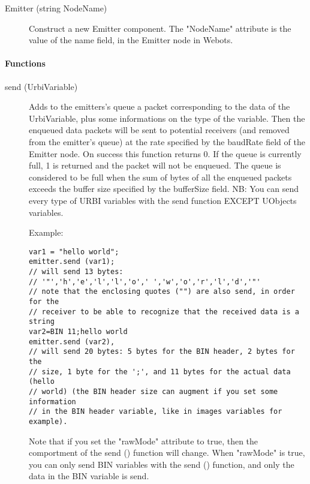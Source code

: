 \noindent
\begin{description}
\item[{Emitter (string NodeName)}] Construct a new Emitter component. The "NodeName" attribute is the value
          of the name field, in the Emitter node in Webots.

\end{description}

\paragraph{Functions}
\label{webots.uobjects.robotdevices.emitter.functions}%

\noindent
\begin{description}
\item[{send (UrbiVariable)}] Adds to the emitters's queue a packet
  corresponding to the data of the UrbiVariable, plus some
  informations on the type of the variable. Then the enqueued data
  packets will be sent to potential receivers (and removed from the
  emitter's queue) at the rate specified by the baudRate field of the
  Emitter node. On success this function returns 0. If the queue is
  currently full, 1 is returned and the packet will not be
  enqueued. The queue is considered to be full when the sum of bytes
  of all the enqueued packets exceeds the buffer size specified by the
  bufferSize field.  NB: You can send every type of URBI variables
  with the send function EXCEPT UObjects variables.


          Example:


\begin{lstlisting}
var1 = "hello world";
emitter.send (var1);
// will send 13 bytes:
// '"','h','e','l','l','o',' ','w','o','r','l','d','"'
// note that the enclosing quotes ("") are also send, in order for the
// receiver to be able to recognize that the received data is a string
var2=BIN 11;hello world
emitter.send (var2),
// will send 20 bytes: 5 bytes for the BIN header, 2 bytes for the
// size, 1 byte for the ';', and 11 bytes for the actual data (hello
// world) (the BIN header size can augment if you set some information
// in the BIN header variable, like in images variables for example).
\end{lstlisting}

Note that if you set the "rawMode" attribute to true, then the
comportment of the send () function will change. When "rawMode" is
true, you can only send BIN variables with the send () function, and
only the data in the BIN variable is send.



\end{description}
